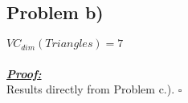 \subsection*{Problem b)}
$VC_{dim}(Triangles) = 7$\\
\\
\textbf{\underline{\textit{Proof:}}}\\
Results directly from Problem c.).
\hfill$\square$

